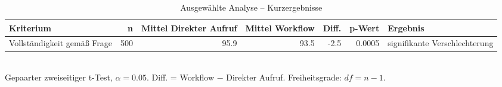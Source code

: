 \begin{table}[htbp]
\centering
\caption{Ausgewählte Analyse -- Kurzergebnisse}
\begin{tabular}{lrrrrrl}
\toprule
Kriterium & n & Mittel Direkter Aufruf & Mittel Workflow & Diff. & p-Wert & Ergebnis \\
\midrule
Vollständigkeit gemäß Frage & 500 & 95.9 & 93.5 & -2.5 & 0.0005 & signifikante Verschlechterung \\
\bottomrule
\end{tabular}
\\[2mm]
\footnotesize Gepaarter zweiseitiger t-Test, $\alpha=0.05$. Diff. = Workflow $-$ Direkter Aufruf. Freiheitsgrade: $df=n-1$.
\end{table}
